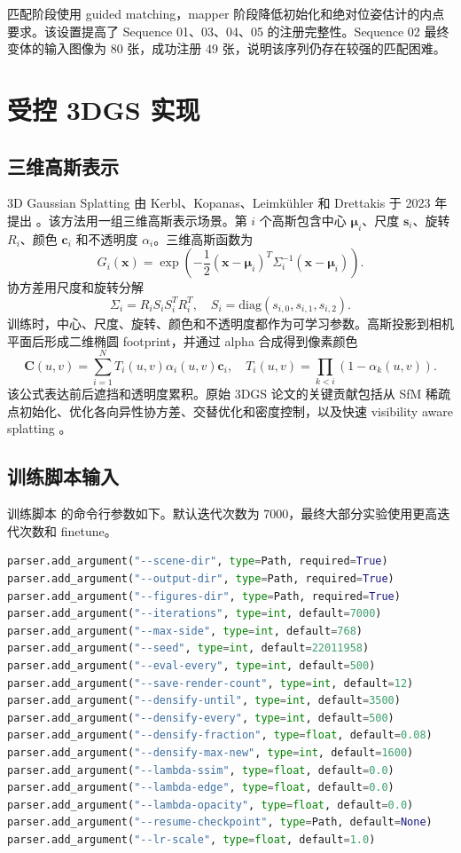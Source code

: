\documentclass[UTF8,a4paper,11pt]{ctexart}
\newcommand{\codepath}[1]{\path{#1}}
\begin{document}
匹配阶段使用 guided matching，mapper 阶段降低初始化和绝对位姿估计的内点要求。该设置提高了 Sequence 01、03、04、05 的注册完整性。Sequence 02 最终变体的输入图像为 80 张，成功注册 49 张，说明该序列仍存在较强的匹配困难。

\section{受控 3DGS 实现}

\subsection{三维高斯表示}

3D Gaussian Splatting 由 Kerbl、Kopanas、Leimkühler 和 Drettakis 于 2023 年提出 \cite{kerbl2023}。该方法用一组三维高斯表示场景。第 \(i\) 个高斯包含中心 \(\boldsymbol{\mu}_i\)、尺度 \(\mathbf{s}_i\)、旋转 \(R_i\)、颜色 \(\mathbf{c}_i\) 和不透明度 \(\alpha_i\)。三维高斯函数为
\[
G_i(\mathbf{x})
=
\exp
\left(
-\frac{1}{2}
(\mathbf{x}-\boldsymbol{\mu}_i)^T
\Sigma_i^{-1}
(\mathbf{x}-\boldsymbol{\mu}_i)
\right).
\]
协方差用尺度和旋转分解
\[
\Sigma_i = R_i S_iS_i^TR_i^T,\quad
S_i=\mathrm{diag}(s_{i,0},s_{i,1},s_{i,2}).
\]
训练时，中心、尺度、旋转、颜色和不透明度都作为可学习参数。高斯投影到相机平面后形成二维椭圆 footprint，并通过 alpha 合成得到像素颜色
\[
\mathbf{C}(u,v)=
\sum_{i=1}^{N}
T_i(u,v)\alpha_i(u,v)\mathbf{c}_i,
\quad
T_i(u,v)=\prod_{k<i}(1-\alpha_k(u,v)).
\]
该公式表达前后遮挡和透明度累积。原始 3DGS 论文的关键贡献包括从 SfM 稀疏点初始化、优化各向异性协方差、交替优化和密度控制，以及快速 visibility aware splatting \cite{kerbl2023}。

\subsection{训练脚本输入}

训练脚本 \codepath{scripts/train_stage2_gsplat.py} 的命令行参数如下。默认迭代次数为 7000，最终大部分实验使用更高迭代次数和 finetune。

\begin{lstlisting}[language=Python,caption={受控 3DGS 训练脚本参数}]
parser.add_argument("--scene-dir", type=Path, required=True)
parser.add_argument("--output-dir", type=Path, required=True)
parser.add_argument("--figures-dir", type=Path, required=True)
parser.add_argument("--iterations", type=int, default=7000)
parser.add_argument("--max-side", type=int, default=768)
parser.add_argument("--seed", type=int, default=22011958)
parser.add_argument("--eval-every", type=int, default=500)
parser.add_argument("--save-render-count", type=int, default=12)
parser.add_argument("--densify-until", type=int, default=3500)
parser.add_argument("--densify-every", type=int, default=500)
parser.add_argument("--densify-fraction", type=float, default=0.08)
parser.add_argument("--densify-max-new", type=int, default=1600)
parser.add_argument("--lambda-ssim", type=float, default=0.0)
parser.add_argument("--lambda-edge", type=float, default=0.0)
parser.add_argument("--lambda-opacity", type=float, default=0.0)
parser.add_argument("--resume-checkpoint", type=Path, default=None)
parser.add_argument("--lr-scale", type=float, default=1.0)
\end{lstlisting}
\end{document}
